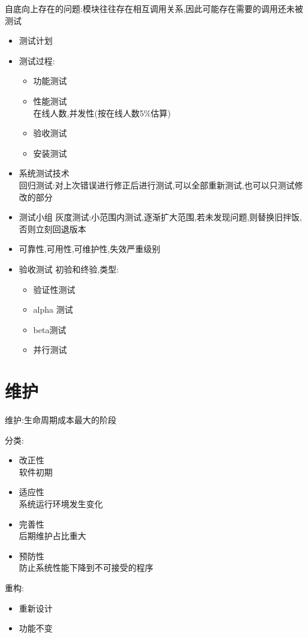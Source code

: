 \documentclass[UTF8,a4paper]{ctexart}
\begin{document}
自底向上存在的问题:模块往往存在相互调用关系,因此可能存在需要的调用还未被测试

\begin{itemize}
  \item 测试计划
  \item 测试过程:
  \begin{itemize}
    \item 功能测试
    \item 性能测试\\
    在线人数,并发性(按在线人数5\%估算)
    \item 验收测试
    \item 安装测试
  \end{itemize}
  \item 系统测试技术\\
  回归测试:对上次错误进行修正后进行测试,可以全部重新测试,也可以只测试修改的部分
  \item 测试小组
  灰度测试:小范围内测试,逐渐扩大范围,若未发现问题,则替换旧拌饭,否则立刻回退版本
  \item 可靠性,可用性,可维护性,失效严重级别
  \item 验收测试
  初验和终验,类型:
  \begin{itemize}
    \item 验证性测试
    \item alpha 测试
    \item beta测试
    \item 并行测试
  \end{itemize}
\end{itemize}

\section{维护}
维护:生命周期成本最大的阶段

分类:
\begin{itemize}
  \item 改正性\\
  软件初期
  \item 适应性\\
  系统运行环境发生变化
  \item 完善性\\
  后期维护占比重大
  \item 预防性\\
  防止系统性能下降到不可接受的程序
\end{itemize}

重构:
\begin{itemize}
  \item 重新设计
  \item 功能不变
\end{itemize}
\end{document}
